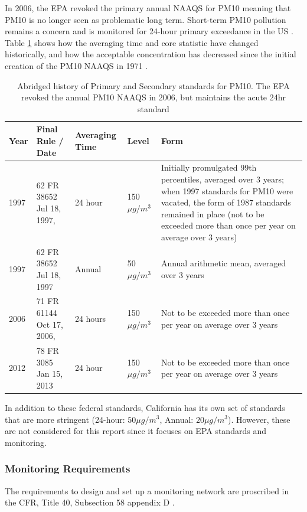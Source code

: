In 2006, the EPA revoked the primary annual \ac{NAAQS} for \ac{PM10} meaning that \ac{PM10} is no longer seen as problematic long term.  Short-term \ac{PM10} pollution remains a concern and is monitored for 24-hour primary exceedance in the US 
.  Table \ref{tab:EPA_PM10_standards} shows how the averaging time and core statistic have changed historically, and how the acceptable concentration has decreased since the initial creation of the \ac{PM10} \ac{NAAQS} in 1971 
.
\begin{table}[ht]
	\centering
	\begin{tabular}{p{}|p{}|p{}|p{0.14%
				\textwidth}|p{}}
		Year & Final Rule / Date & Averaging Time & Level & Form \\
		\hline
		1997 & 62 FR 38652 Jul 18, 1997, & 24 hour & 150 $\mu g/m^3$ &	Initially promulgated 99th percentiles, averaged over 3 years; when 1997 standards for PM10 were vacated, the form of 1987 standards remained in place (not to be exceeded more than once per year on average over 3 years) \\
		1997 & 62 FR 38652 Jul 18, 1997 & Annual & 50 $\mu g/m^3$ & Annual arithmetic mean, averaged over 3 years \\
		2006 & 71 FR 61144 Oct 17, 2006, & 24 hours & 150 $\mu g/m^3$ & Not to be exceeded more than once per year on average over 3 years \\
		2012 & 78 FR 3085 Jan 15, 2013 & 24 hour & 150 $\mu g/m^3$ & Not to be exceeded more than once per year on average over 3 years \\
	\end{tabular}
	\caption{Abridged history of Primary and Secondary standards for PM10.  The \ac{EPA} revoked the annual PM10 \ac{NAAQS} in 2006, but maintains the acute 24hr standard 
	}
	\label{tab:EPA_PM10_standards}
\end{table}

In addition to these federal standards, California has its own set of standards that are more stringent (24-hour: $50 \mu g/m^3$, Annual: $20 \mu g/m^3$).  However, these are not considered for this report since it focuses on \ac{EPA} standards and monitoring.

\subsubsection*{Monitoring Requirements}\label{subsubsec:monreqs}
The requirements to design and set up a monitoring network are proscribed in the \ac{CFR}, Title 40, Subsection 58 appendix D \citep{CFR:Title40-58}.

